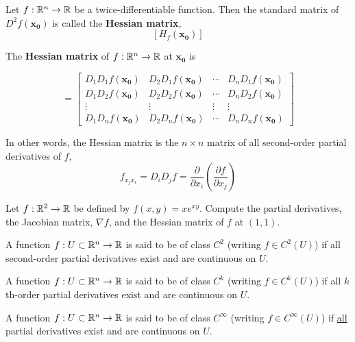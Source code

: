 \begin{definition}
Let $f: \mathbb{R}^n \to \mathbb{R}$ be a twice-differentiable function. Then the standard matrix of $D^2f(\bm{x_0})$ is called the \textbf{Hessian matrix}, 
$$\left[H_f(\bm{x_0})\right]$$
\end{definition}

\begin{proposition}
    The \textbf{Hessian matrix} of $f:\mathbb{R}^n \to \mathbb{R}$ at $\bm{x_0}$ is 
    
    \begin{equation*}
        [H_f(\bm{x_0})] = \begin{bmatrix}
D_1D_1f(\bm{x_0}) & D_2D_1f(\bm{x_0}) & \cdots & D_nD_1f(\bm{x_0}) \\
D_1D_2f(\bm{x_0}) & D_2D_2f(\bm{x_0}) & \cdots & D_nD_2f(\bm{x_0}) \\
\vdots & \vdots & \vdots & \vdots\\
D_1D_nf(\bm{x_0}) & D_2D_nf(\bm{x_0}) & \cdots & D_nD_nf(\bm{x_0}) 
\end{bmatrix}
    \end{equation*}
\end{proposition}

In other words, the Hessian matrix is the $n \times n$ matrix of all second-order partial derivatives of $f$,
    $$f_{x_jx_i} = D_iD_j f = \frac{\partial}{\partial x_i}\left(\frac{\partial f}{\partial x_j}\right)$$


\begin{example}
    Let $f : \mathbb{R}^2 \to \mathbb{R}$ be defined by $f(x,y)= xe^{xy}$.  Compute the partial derivatives, the Jacobian matrix, $\nabla f$, and the Hessian matrix of $f$ at $(1,1)$.
\end{example}

\begin{definition}
        A function $f : U \subset \mathbb{R}^n \to \mathbb{R}$ is said to be of class $C^2$ (writing $f \in C^2(U)$) if all second-order partial derivatives exist and are continuous on $U$.
    \end{definition}


    \begin{definition}
        A function $f : U \subset \mathbb{R}^n \to \mathbb{R}$ is said to be of class $C^k$ (writing $f \in C^k(U)$) if all $k$th-order partial derivatives exist and are continuous on $U$.
    \end{definition}


    \begin{definition}
        A function $f : U \subset \mathbb{R}^n \to \mathbb{R}$ is said to be of class $C^\infty$ (writing $f \in C^\infty(U)$) if \underline{all} partial derivatives exist and are continuous on $U$.
    \end{definition}

